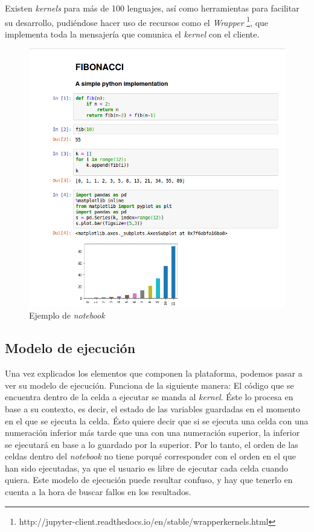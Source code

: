 \documentclass[11pt,spanish,listoffigures]{tfgetsinf}
\begin{document}
Existen \textit{kernels} para más de 100 lenguajes, así como herramientas para facilitar su desarrollo, pudiéndose hacer uso de recursos como el \textit{Wrapper} \footnote{http://jupyter-client.readthedocs.io/en/stable/wrapperkernels.html}, que implementa toda la mensajería que comunica el \textit{kernel} con el cliente.

\begin{figure}[H]
	\centering
  	\includegraphics[width=\linewidth]{notebook.png}
  	\caption{Ejemplo de \textit{notebook}}
  	\label{fig:notebook}
\end{figure}


\subsection{Modelo de ejecución}
\label{subsec:modelo-ejec}

Una vez explicados los elementos que componen la plataforma, podemos pasar a ver su modelo de ejecución. Funciona de la siguiente manera: El código que se encuentra dentro de la celda a ejecutar se manda al \textit{kernel}. Éste lo procesa en base a su contexto, es decir, el estado de las variables guardadas en el momento en el que se ejecuta la celda. Ésto quiere decir que si se ejecuta una celda con una numeración inferior más tarde que una con una numeración superior, la inferior se ejecutará en base a lo guardado por la superior. Por lo tanto, el orden de las celdas dentro del \textit{notebook} no tiene porqué corresponder con el orden en el que han sido ejecutadas, ya que el usuario es libre de ejecutar cada celda cuando quiera. Este modelo de ejecución puede resultar confuso, y hay que tenerlo en cuenta a la hora de buscar fallos en los resultados.
\end{document}
